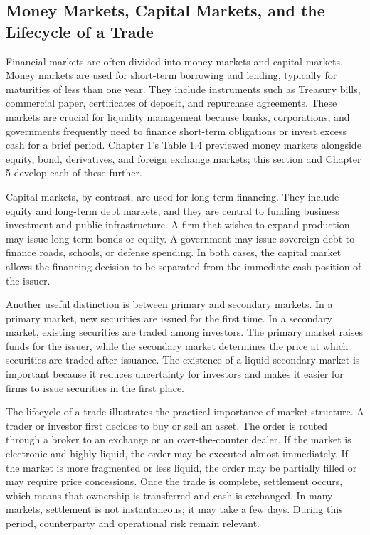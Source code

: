 \documentclass[../ai_in_finance]{subfiles}
\begin{document}
\subsection{Money Markets, Capital Markets, and the Lifecycle of a Trade}

Financial markets are often divided into money markets and capital markets. Money markets are used for short-term borrowing and lending, typically for maturities of less than one year. They include instruments such as Treasury bills, commercial paper, certificates of deposit, and repurchase agreements. These markets are crucial for liquidity management because banks, corporations, and governments frequently need to finance short-term obligations or invest excess cash for a brief period. Chapter 1's Table 1.4 previewed money markets alongside equity, bond, derivatives, and foreign exchange markets; this section and Chapter 5 develop each of these further.

Capital markets, by contrast, are used for long-term financing. They include equity and long-term debt markets, and they are central to funding business investment and public infrastructure. A firm that wishes to expand production may issue long-term bonds or equity. A government may issue sovereign debt to finance roads, schools, or defense spending. In both cases, the capital market allows the financing decision to be separated from the immediate cash position of the issuer.

Another useful distinction is between primary and secondary markets. In a primary market, new securities are issued for the first time. In a secondary market, existing securities are traded among investors. The primary market raises funds for the issuer, while the secondary market determines the price at which securities are traded after issuance. The existence of a liquid secondary market is important because it reduces uncertainty for investors and makes it easier for firms to issue securities in the first place.

The lifecycle of a trade illustrates the practical importance of market structure. A trader or investor first decides to buy or sell an asset. The order is routed through a broker to an exchange or an over-the-counter dealer. If the market is electronic and highly liquid, the order may be executed almost immediately. If the market is more fragmented or less liquid, the order may be partially filled or may require price concessions. Once the trade is complete, settlement occurs, which means that ownership is transferred and cash is exchanged. In many markets, settlement is not instantaneous; it may take a few days. During this period, counterparty and operational risk remain relevant.
\end{document}
